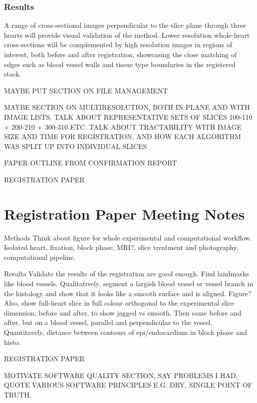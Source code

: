   \subsubsection{Results}
    A range of cross-sectional images perpendicular to the slice plane through three hearts will provide visual validation of the method. Lower resolution whole-heart cross-sections will be complemented by high resolution images in regions of interest, both before and after registration, showcasing the close matching of edges such as blood vessel walls and tissue type boundaries in the registered stack.
    
    MAYBE PUT SECTION ON FILE MANAGEMENT
    
    MAYBE SECTION ON MULTIRESOLUTION, BOTH IN PLANE AND WITH IMAGE LISTS. TALK ABOUT REPRESENTATIVE SETS OF SLICES 100-110 + 200-210 + 300-310 ETC. TALK ABOUT TRACTABILITY WITH IMAGE SIZE AND TIME FOR REGISTRATION, AND HOW EACH ALGORITHM WAS SPLIT UP INTO INDIVIDUAL SLICES
    
PAPER OUTLINE FROM CONFIRMATION REPORT

REGISTRATION PAPER

% 
% 
\section{Registration Paper Meeting Notes}

Methods
Think about figure for whole experimental and computational workflow. Isolated heart, fixation, block phase, MRI?, slice treatment and photography, computational pipeline.

Results
Validate the results of the registration are good enough. Find landmarks like blood vessels. Qualitatively, segment a largish blood vessel or vessel branch in the histology and show that it looks like a smooth surface and is aligned. Figure? Also, show full-heart slice in full colour orthogonal to the experimental slice dimension, before and after, to show jagged vs smooth. Then same before and after, but on a blood vessel, parallel and perpendicular to the vessel. Quantitavely, distance between contours of epi/endocardium in block phase and histo.



REGISTRATION PAPER

MOTIVATE SOFTWARE QUALITY SECTION, SAY PROBLEMS I HAD, QUOTE VARIOUS SOFTWARE PRINCIPLES E.G. DRY, SINGLE POINT OF TRUTH,


